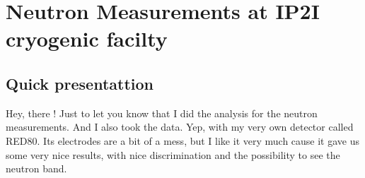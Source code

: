 
\chapter{Neutron Measurements at IP2I cryogenic facilty} %

\label{Chapter-neutron} %


\section{Quick presentattion}

Hey, there !
Just to let you know that I did the analysis for the neutron measurements. And I also took the data. Yep, with my very own detector called RED80. Its electrodes are a bit of a mess, but I like it very much cause it gave us some very nice results, with nice discrimination and the possibility to see the neutron band.